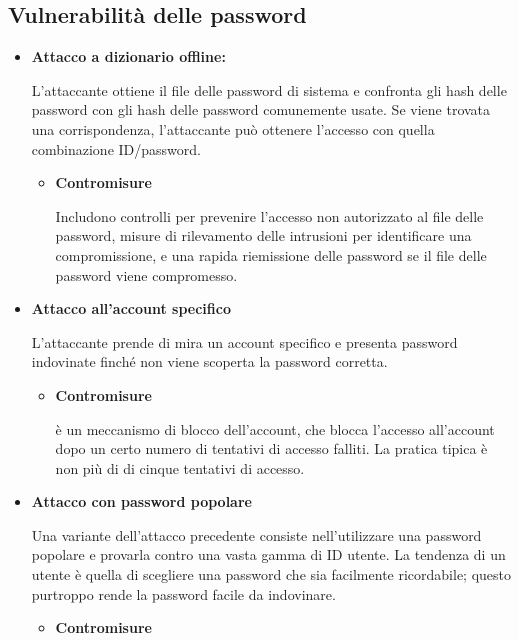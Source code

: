 \subsection{Vulnerabilità delle password}
\begin{itemize}
    \item \textbf{Attacco a dizionario offline:}
    
L'attaccante ottiene il file delle password di sistema e confronta gli hash delle password con gli hash delle password comunemente usate. Se viene trovata una corrispondenza, l'attaccante può ottenere l'accesso con quella combinazione ID/password.

        \begin{itemize}
            \item \textbf{Contromisure} 
            
            Includono controlli per prevenire l'accesso non autorizzato al file delle password, misure di rilevamento delle intrusioni per identificare una compromissione, e una rapida riemissione delle password se il file delle password viene compromesso.
        \end{itemize}

\item \textbf{Attacco all'account specifico}

L'attaccante prende di mira un account specifico e presenta password indovinate finché non viene scoperta la password corretta.

    \begin{itemize}
        \item \textbf{Contromisure} 
        
        è un meccanismo di blocco dell'account, che blocca l'accesso all'account dopo un certo numero di tentativi di accesso falliti. La pratica tipica è non più di di cinque tentativi di accesso.
    \end{itemize}

\item \textbf{Attacco con password popolare}

Una variante dell'attacco precedente consiste nell'utilizzare una password popolare e provarla contro una vasta gamma di ID utente. La tendenza di un utente è quella di scegliere una password che sia facilmente ricordabile; questo purtroppo rende la password facile da indovinare.

    \begin{itemize}
        \item \textbf{Contromisure} 
        

\end{itemize}
\end{itemize}
